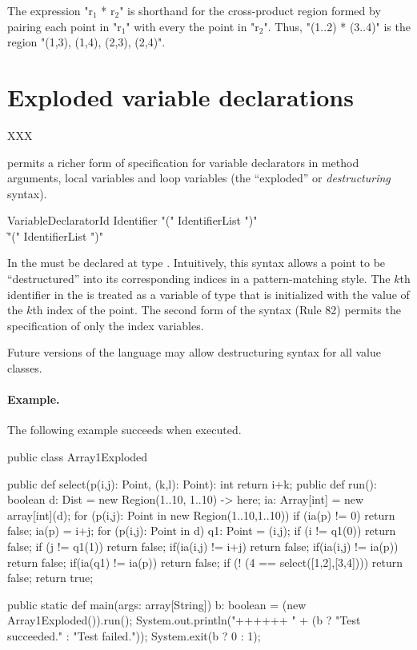 The expression \xcdmath"r$_1$ * r$_2$" is shorthand for the
cross-product region formed by pairing each point in \xcdmath"r$_1$"
with every the point in \xcdmath"r$_2$".  Thus, \xcd"(1..2) * (3..4)"
is the region \xcd"(1,3), (1,4), (2,3), (2,4)".

\section{Exploded variable declarations}\label{exploded-syntax}

XXX

\Xten{} permits a richer form of specification for variable
declarators in method arguments, local variables and loop variables
(the ``exploded'' or {\em destructuring} syntax).

\begin{grammar}
VariableDeclaratorId \:
           Identifier \xcd"(" IdentifierList \xcd")" \\
           \| \xcd"(" IdentifierList \xcd")" \\
\end{grammar}

In \XtenCurrVer{} the  must be declared at
type . Intuitively, this syntax allows a
point to be ``destructured'' into its corresponding  
indices in a pattern-matching style.
The $k$th identifier in the  is treated as a  variable of type 
that is initialized with the value of the $k$th index of the point. 
The second form of the syntax (Rule 82) permits the specification of only
the index variables.

Future versions of the language may allow destructuring syntax for all
value classes.

\paragraph{Example.}
The following example succeeds when executed.
\begin{xten}
public class Array1Exploded {
  public def select(p(i,j): Point, (k,l): Point): int {
      return i+k;
  }
  public def run(): boolean {
    d: Dist = new Region(1..10, 1..10) -> here;
    ia: Array[int] = new array[int](d);
    for (p(i,j): Point in new Region(1..10,1..10)) {
        if (ia(p) != 0) return false;
        ia(p) = i+j;
    }
    for (p(i,j): Point in d) {
      q1: Point = (i,j);
      if (i != q1(0)) return false;
      if (j != q1(1)) return false;
      if(ia(i,j) != i+j) return false;
      if(ia(i,j) != ia(p)) return false;
      if(ia(q1)  != ia(p)) return false;
    }
    if (! (4 == select([1,2],[3,4]))) return false;
    return true;
  }
        
  public static def main(args: array[String]) {
     b: boolean = (new Array1Exploded()).run();
     System.out.println("++++++ "
                        + (b ? "Test succeeded."
                             : "Test failed."));
     System.exit(b ? 0 : 1);
  }
}
\end{xten}



